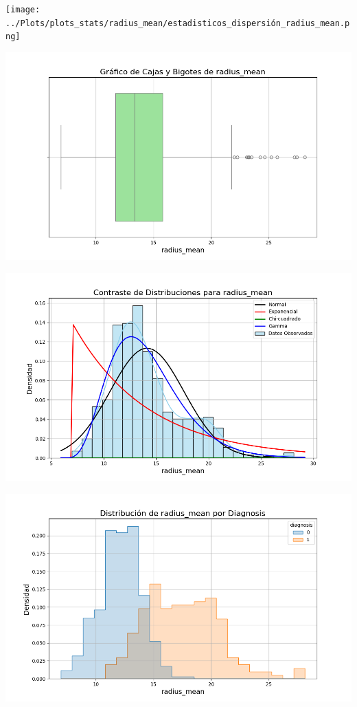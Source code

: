 \documentclass[a4paper, 12pt]{article}
\begin{document}
\texttt{[image: ../Plots/plots\_stats/radius\_mean/estadisticos\_dispersión\_radius\_mean.png]}

\includegraphics[width=\textwidth]{../Plots/plots_stats/radius_mean/boxplot_radius_mean.png}

\includegraphics[width=\textwidth]{../Plots/plots_stats/radius_mean/distribuciones_conocidas_radius_mean.png}

\includegraphics[width=\textwidth]{../Plots/plots_diagnosis/distribucion_radius_mean_por_diagnosis.png}
\end{document}

